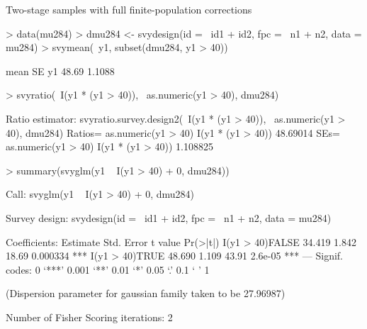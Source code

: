 \documentclass{article}
\begin{document}
Two-stage samples with full finite-population corrections
\begin{Schunk}
\begin{Sinput}
> data(mu284)
> dmu284 <- svydesign(id = ~id1 + id2, fpc = ~n1 + n2, data = mu284)
> svymean(~y1, subset(dmu284, y1 > 40))
\end{Sinput}
\begin{Soutput}
    mean     SE
y1 48.69 1.1088
\end{Soutput}
\begin{Sinput}
> svyratio(~I(y1 * (y1 > 40)), ~as.numeric(y1 > 40), dmu284)
\end{Sinput}
\begin{Soutput}
Ratio estimator: svyratio.survey.design2(~I(y1 * (y1 > 40)), ~as.numeric(y1 > 
    40), dmu284)
Ratios=
                  as.numeric(y1 > 40)
I(y1 * (y1 > 40))            48.69014
SEs=
                  as.numeric(y1 > 40)
I(y1 * (y1 > 40))            1.108825
\end{Soutput}
\begin{Sinput}
> summary(svyglm(y1 ~ I(y1 > 40) + 0, dmu284))
\end{Sinput}
\begin{Soutput}
Call:
svyglm(y1 ~ I(y1 > 40) + 0, dmu284)

Survey design:
svydesign(id = ~id1 + id2, fpc = ~n1 + n2, data = mu284)

Coefficients:
                Estimate Std. Error t value Pr(>|t|)    
I(y1 > 40)FALSE   34.419      1.842   18.69 0.000334 ***
I(y1 > 40)TRUE    48.690      1.109   43.91  2.6e-05 ***
---
Signif. codes:  0 ‘***’ 0.001 ‘**’ 0.01 ‘*’ 0.05 ‘.’ 0.1 ‘ ’ 1 

(Dispersion parameter for gaussian family taken to be 27.96987)

Number of Fisher Scoring iterations: 2
\end{Soutput}
\end{Schunk}
\end{document}
